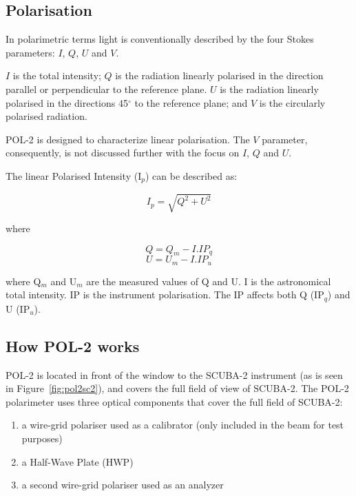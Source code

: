\subsection*{Polarisation}

In polarimetric terms light is conventionally described by the four
Stokes parameters: $I$, $Q$, $U$ and $V$.


$I$ is the total intensity; $Q$ is the radiation linearly polarised in
the direction parallel or perpendicular to the reference plane. $U$ is
the radiation linearly polarised in the directions 45$^{\circ }$ to
the reference plane; and $V$ is the circularly polarised radiation.

POL-2 is designed to characterize linear polarisation.  The $V$
parameter, consequently, is not discussed further with the focus on $I$,
$Q$ and $U$.

The linear Polarised Intensity (I$_{p}$) can be described as:

\begin{equation}
I_{p} = \sqrt{Q^{2}+U^{2}}
\end{equation}

where

\begin{equation}
Q = Q_{m} - I . IP_{q}
\end{equation}
\begin{equation}
U = U_{m} - I . IP_{u}
\end{equation}

where Q$_{m}$ and U$_{m}$ are the measured values of Q and U.  I is
the astronomical total intensity.  IP is the instrument
polarisation. The IP affects both Q (IP$_{q}$) and U (IP$_{u}$).


\subsection*{How POL-2 works}

POL-2 is located in front of the window to the SCUBA-2 instrument (as
is seen in Figure~\ref{fig:pol2sc2}), and covers the full field of
view of SCUBA-2. The POL-2 polarimeter uses three optical components
that cover the full field of SCUBA-2:

\begin{enumerate}
\item a wire-grid polariser used as a calibrator (only included in the
  beam for test purposes)
\item a Half-Wave Plate (HWP)
\item a second wire-grid polariser used as an analyzer
\end{enumerate}


